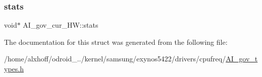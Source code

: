 \subsubsection{\texorpdfstring{stats}{stats}}
{\footnotesize\ttfamily void$\ast$ A\+I\+\_\+gov\+\_\+cur\+\_\+\+H\+W\+::stats}



The documentation for this struct was generated from the following file\+:\begin{DoxyCompactItemize}
\item 
/home/alxhoff/odroid\+\_../kernel/samsung/exynos5422/drivers/cpufreq/\hyperlink{AI__gov__types_8h}{A\+I\+\_\+gov\+\_\+types.\+h}\end{DoxyCompactItemize}
